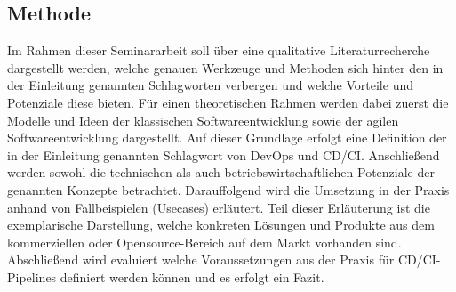 \subsection{Methode}
\label{Methode}
Im Rahmen dieser Seminararbeit soll über eine qualitative Literaturrecherche dargestellt werden, welche genauen Werkzeuge und Methoden sich hinter den in der Einleitung genannten Schlagworten verbergen und welche Vorteile und Potenziale diese bieten.
Für einen theoretischen Rahmen werden dabei zuerst die Modelle und Ideen der klassischen Softwareentwicklung sowie der agilen Softwareentwicklung dargestellt. Auf dieser Grundlage erfolgt eine Definition der in der Einleitung genannten Schlagwort von \gls{DevOps} und \acrshort{CD}/\acrshort{CI}.
Anschließend werden sowohl die technischen als auch betriebswirtschaftlichen Potenziale der genannten Konzepte betrachtet. Darauffolgend wird die Umsetzung in der Praxis anhand von Fallbeispielen (Usecases) erläutert. Teil dieser Erläuterung ist die exemplarische Darstellung, welche konkreten Lösungen und Produkte aus dem kommerziellen oder Opensource-Bereich  auf dem Markt vorhanden sind.
Abschließend wird evaluiert welche Voraussetzungen aus der Praxis  für \acrshort{CD}/\acrshort{CI}-Pipelines definiert werden können und es erfolgt ein Fazit.